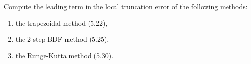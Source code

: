 

Compute the leading term in the local truncation error of the following
methods:
\begin{enumerate}
\item the trapezoidal method (5.22),
\item the 2-step BDF method (5.25),
\item the Runge-Kutta method (5.30).
\end{enumerate} 
